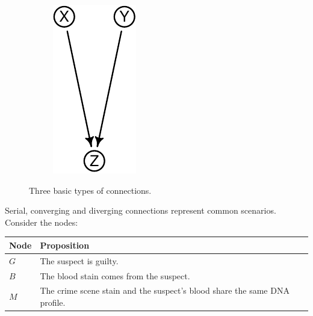 \documentclass[
  10pt,
  dvipsnames,enabledeprecatedfontcommands]{scrartcl}
\begin{document}
\begin{figure}[H]
{\begin{subfigure}[!ht]{0.32\textwidth}
\begin{center}\includegraphics[width=0.75\linewidth]{conjunction-appendix14_files/figure-latex/unnamed-chunk-4-1} \end{center}
\end{subfigure}}
\normalsize
\caption{Three basic types of connections.}
\label{fig:connectionsBN}
\end{figure}

\noindent Serial, converging and diverging connections represent common
scenarios. Consider the nodes:

\footnotesize 
\begin{center}
\begin{tabular}{@{}lp{5.3cm}@{}}\toprule
Node & Proposition \\ \midrule 
$G$ & The suspect is guilty. \\
$B$ & The blood stain comes from the suspect.\\
$M$ & The crime scene stain and the suspect's blood share the same DNA profile.\\
\bottomrule
\end{tabular}
\end{center}
\normalsize
\end{document}
